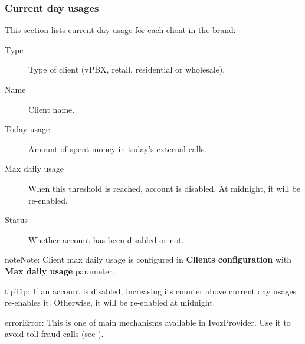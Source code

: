 \documentclass[letterpaper,10pt,english]{sphinxmanual}
\begin{document}
\subsubsection{Current day usages}
\label{administration_portal/brand/billing/current_day_usages:current-day-usages}\label{administration_portal/brand/billing/current_day_usages::doc}
This section lists current day usage for each client in the brand:
\begin{description}
\item[{Type}] \leavevmode{}\label{administration_portal/brand/billing/current_day_usages:term-type}
Type of client (vPBX, retail, residential or wholesale).

\item[{Name}] \leavevmode{}\label{administration_portal/brand/billing/current_day_usages:term-name}
Client name.

\item[{Today usage}] \leavevmode{}\label{administration_portal/brand/billing/current_day_usages:term-today-usage}
Amount of spent money in today's external calls.

\item[{Max daily usage}] \leavevmode{}\label{administration_portal/brand/billing/current_day_usages:term-max-daily-usage}
When this threshold is reached, account is disabled. At midnight, it will be re-enabled.

\item[{Status}] \leavevmode{}\label{administration_portal/brand/billing/current_day_usages:term-status}
Whether account has been disabled or not.

\end{description}

\begin{notice}{note}{Note:}
Client max daily usage is configured in \textbf{Clients configuration} with \textbf{Max daily usage} parameter.
\end{notice}

\begin{notice}{tip}{Tip:}
If an account is disabled, increasing its counter above current day usages re-enables it. Otherwise, it will be
re-enabled at midnight.
\end{notice}

\begin{notice}{error}{Error:}
This is one of main {\hyperref[security_and_maintenance/security/index:security]{}} mechanisms available in IvozProvider. Use it to avoid toll fraud calls
(see {\hyperref[security_and_maintenance/security/current_day_max_usage:current\string-day\string-max\string-usage]{}}).
\end{notice}
\end{document}
